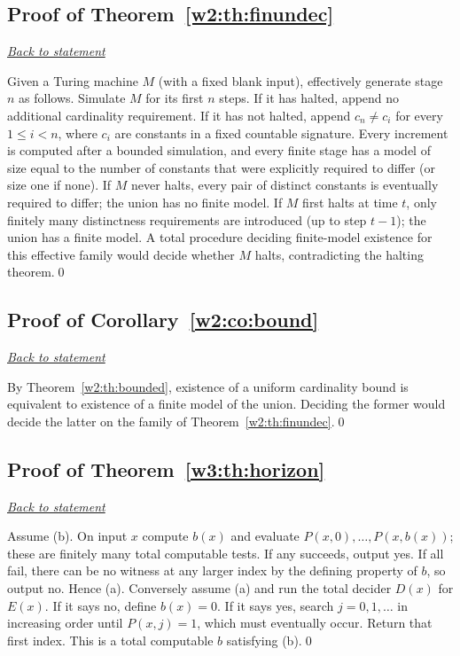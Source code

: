 \documentclass[11pt,letterpaper]{article}
\theoremstyle{definition}\newtheorem{definition}[theorem]{Definition}\newtheorem{example}[theorem]{Example}
\theoremstyle{remark}\newtheorem{remark}[theorem]{Remark}
\newcommand{\backlink}[1]{\noindent\hyperref[#1]{\textit{Back to statement}}\par\smallskip}
\begin{document}
\subsection{Proof of Theorem~\ref{w2:th:finundec}}\label{w2:pr:finundec}\backlink{w2:th:finundec}
Given a Turing machine $M$ (with a fixed blank input), effectively generate stage $n$ as follows. Simulate $M$ for its first $n$ steps. If it has halted, append no additional cardinality requirement. If it has not halted, append $c_n\ne c_i$ for every $1\le i<n$, where $c_i$ are constants in a fixed countable signature. Every increment is computed after a bounded simulation, and every finite stage has a model of size equal to the number of constants that were explicitly required to differ (or size one if none). If $M$ never halts, every pair of distinct constants is eventually required to differ; the union has no finite model. If $M$ first halts at time $t$, only finitely many distinctness requirements are introduced (up to step $t-1$); the union has a finite model. A total procedure deciding finite-model existence for this effective family would decide whether $M$ halts, contradicting the halting theorem.\qed


\subsection{Proof of Corollary~\ref{w2:co:bound}}\label{w2:pr:bound}\backlink{w2:co:bound}
By Theorem~\ref{w2:th:bounded}, existence of a uniform cardinality bound is equivalent to existence of a finite model of the union. Deciding the former would decide the latter on the family of Theorem~\ref{w2:th:finundec}.\qed



\subsection{Proof of Theorem~\ref{w3:th:horizon}}\label{w3:pr:horizon}\backlink{w3:th:horizon}
Assume (b). On input $x$ compute $b(x)$ and evaluate $P(x,0),\dots,P(x,b(x))$; these are finitely many total computable tests. If any succeeds, output yes. If all fail, there can be no witness at any larger index by the defining property of $b$, so output no. Hence (a). Conversely assume (a) and run the total decider $D(x)$ for $E(x)$. If it says no, define $b(x)=0$. If it says yes, search $j=0,1,\dots$ in increasing order until $P(x,j)=1$, which must eventually occur. Return that first index. This is a total computable $b$ satisfying (b).\qed
\end{document}
